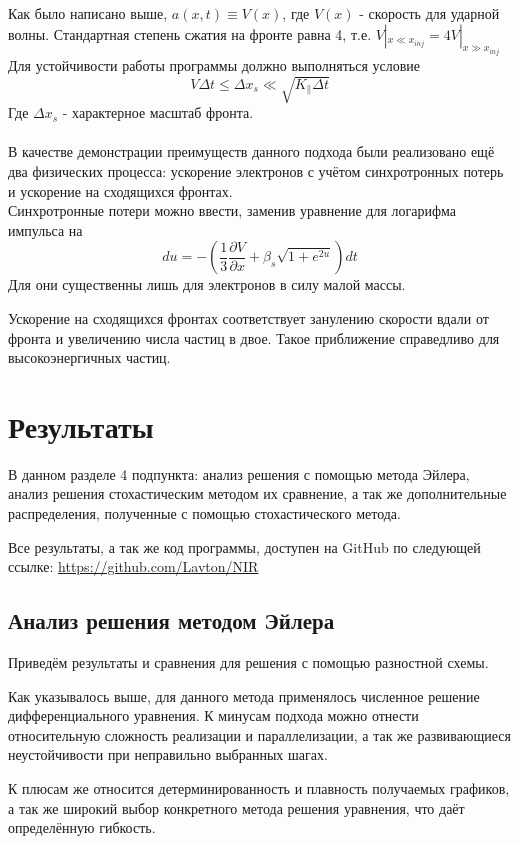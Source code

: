 \documentclass[a4paper,14pt]{extarticle} %
\begin{document}
Как было написано выше, $a(x,t) \equiv V(x)$, где $V(x)$ - скорость для ударной волны. Стандартная степень сжатия на фронте равна 4, т.е. $V|_{x \ll x_{inj}} = 4V|_{x \gg x_{inj}}$
Для устойчивости работы программы должно выполняться условие
\begin{equation}
V\Delta t \le \Delta x_s \ll \sqrt{K_\parallel \Delta t}
\end{equation}
Где $\Delta x_s$ - характерное масштаб фронта. ~\\~\\
В качестве демонстрации преимуществ данного подхода были реализовано ещё два физических процесса: ускорение электронов с учётом синхротронных потерь и ускорение на сходящихся фронтах.\\
Синхротронные потери можно ввести, заменив уравнение для логарифма импульса на 
\begin{equation}
du = - \left( \frac{1}{3} \frac{\partial V}{\partial x}  + \beta_s\sqrt{1+e^{2u}} \right) dt
\end{equation}
Для они существенны лишь для электронов в силу малой массы.


Ускорение на сходящихся фронтах соответствует занулению скорости вдали от фронта и увеличению числа частиц в двое. Такое приближение справедливо для высокоэнергичных частиц.

\section{Результаты}
В данном разделе 4 подпункта: анализ решения с помощью метода Эйлера, анализ решения стохастическим методом их сравнение, а так же дополнительные распределения, полученные с помощью стохастического метода.

Все результаты, а так же код программы, доступен на GitHub по следующей ссылке: \url{https://github.com/Lavton/NIR}
\subsection{Анализ решения методом Эйлера}
Приведём результаты и сравнения для решения с помощью разностной схемы. 

Как указывалось выше, для данного метода применялось численное решение дифференциального уравнения. К минусам подхода можно отнести относительную сложность реализации и параллелизации, а так же развивающиеся неустойчивости при неправильно выбранных шагах.

К плюсам же относится детерминированность и плавность получаемых графиков, а так же широкий выбор конкретного метода решения уравнения, что даёт определённую гибкость.
\end{document}
